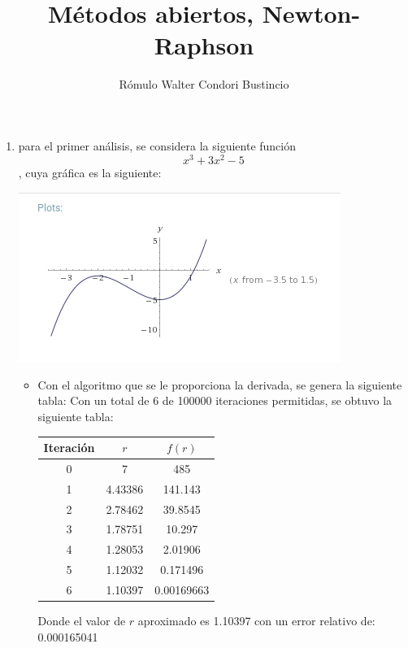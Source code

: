 \documentclass[10pt]{article}
\title{M\'etodos abiertos, Newton-Raphson}
\author{R\'omulo Walter Condori Bustincio}
\date{}
\begin{document}
\maketitle
\begin{enumerate}
\item para el primer an\'alisis, se considera la siguiente funci\'on $$x^3 + 3x^2 - 5$$, cuya gr\'afica es la siguiente:
\begin{center}
 \includegraphics[scale=0.8]{./grafica1.jpg}
\end{center}
\begin{itemize}
 \item Con el algoritmo que se le proporciona la derivada, se genera la siguiente tabla:
 Con un total de 6 de 100000 iteraciones permitidas, se obtuvo la siguiente tabla:
\begin{center}
\begin{tabular}{|c|c|c|}
\hline
Iteraci\'on&$r$&$f(r)$\\
\hline
0&7&485\\
1&4.43386&141.143\\
2&2.78462&39.8545\\
3&1.78751&10.297\\
4&1.28053&2.01906\\
5&1.12032&0.171496\\
6&1.10397&0.00169663\\
\hline
\end{tabular}
\end{center}
Donde el valor de $r$ aproximado es 1.10397 con un error relativo de: 0.000165041


\end{itemize}
\end{enumerate}
\end{document}
